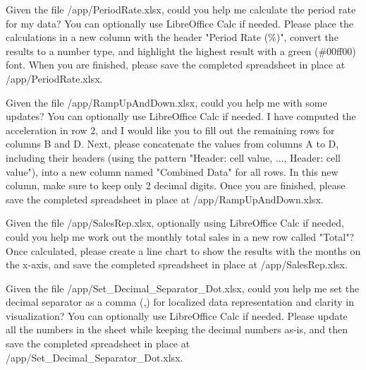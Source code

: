 \documentclass{llmxive}
\begin{document}
\begin{instructionbox}
Given the file \textasciigrave{}/app/PeriodRate.xlsx\textasciigrave{}, could you help me calculate the period rate for my data? You can optionally use LibreOffice Calc if needed. Please place the calculations in a new column with the header "Period Rate (\%)", convert the results to a number type, and highlight the highest result with a green (\#00ff00) font. When you are finished, please save the completed spreadsheet in place at \textasciigrave{}/app/PeriodRate.xlsx\textasciigrave{}.
\end{instructionbox}

\begin{instructionbox}
Given the file \textasciigrave{}/app/RampUpAndDown.xlsx\textasciigrave{}, could you help me with some updates? You can optionally use LibreOffice Calc if needed. I have computed the acceleration in row 2, and I would like you to fill out the remaining rows for columns B and D. Next, please concatenate the values from columns A to D, including their headers (using the pattern "Header: cell value, ..., Header: cell value"), into a new column named "Combined Data" for all rows. In this new column, make sure to keep only 2 decimal digits. Once you are finished, please save the completed spreadsheet in place at \textasciigrave{}/app/RampUpAndDown.xlsx\textasciigrave{}.
\end{instructionbox}

\begin{instructionbox}
Given the file \textasciigrave{}/app/SalesRep.xlsx\textasciigrave{}, optionally using LibreOffice Calc if needed, could you help me work out the monthly total sales in a new row called "Total"? Once calculated, please create a line chart to show the results with the months on the x-axis, and save the completed spreadsheet in place at \textasciigrave{}/app/SalesRep.xlsx\textasciigrave{}.
\end{instructionbox}

\begin{instructionbox}
Given the file \textasciigrave{}/app/Set\_Decimal\_Separator\_Dot.xlsx\textasciigrave{}, could you help me set the decimal separator as a comma (,) for localized data representation and clarity in visualization? You can optionally use LibreOffice Calc if needed. Please update all the numbers in the sheet while keeping the decimal numbers as-is, and then save the completed spreadsheet in place at \textasciigrave{}/app/Set\_Decimal\_Separator\_Dot.xlsx\textasciigrave{}.
\end{instructionbox}
\end{document}
